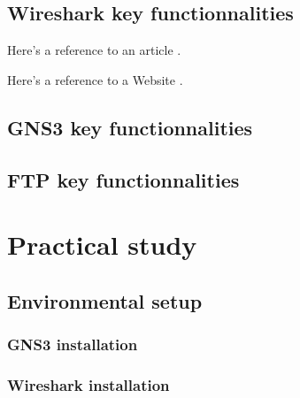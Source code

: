 \documentclass[12pt,a4paper,oneside,english]{book}
\begin{document}
{\section{Wireshark key functionnalities}
Here's a reference to an article \cite{fisher1936use}.

Here's a reference to a Website \cite{insat}.

\section{GNS3 key functionnalities}
\section{FTP key functionnalities}



\chapter{Practical study}
\section{Environmental setup}
\subsection{GNS3 installation}
\subsection {Wireshark installation}
}
\end{document}
